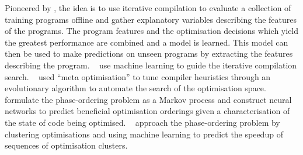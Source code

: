 Pioneered by \citeauthor{Agakov}, the idea is to use iterative compilation to evaluate a collection of training programs offline and gather explanatory variables describing the features of the programs. The program features and the optimisation decisions which yield the greatest performance are combined and a model is learned. This model can then be used to make predictions on unseen programs by extracting the features describing the program. \citeauthor{Agakov}~\cite{Agakov} use machine learning to guide the iterative compilation search.
\citeauthor{Stephenson2003}~\cite{Stephenson2003} used ``meta optimisation'' to tune compiler heuristics through an evolutionary algorithm to automate the search of the optimisation space.
\citeauthor{Kulkarni2012}~\cite{Kulkarni2012} formulate the phase-ordering problem as a Markov process and construct neural networks to predict beneficial optimisation orderings given a characterisation of the state of code being optimised.
\citeauthor{Ashouri2017}~\cite{Ashouri2017} approach the phase-ordering problem by clustering optimisations and using machine learning to predict the speedup of sequences of optimisation clusters.

